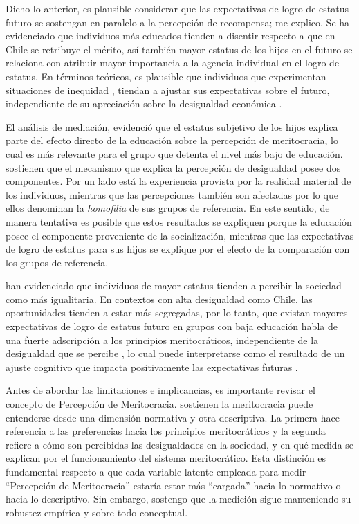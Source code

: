 \documentclass[12pt]{article}
\begin{document}
Dicho lo anterior, es plausible considerar que las expectativas de logro de estatus futuro se sostengan en paralelo a la percepción de recompensa; me explico. Se ha evidenciado que individuos más educados tienden a disentir respecto a que en Chile se retribuye el mérito, así también mayor estatus de los hijos en el futuro se relaciona con atribuir mayor importancia a la agencia individual en el logro de estatus. En términos teóricos, es plausible que individuos que experimentan situaciones de inequidad \citep{Adams1965}, tiendan a ajustar sus expectativas sobre el futuro, independiente de su apreciación sobre la desigualdad económica \citep{Castillo2012,Trump2017}.

El análisis de mediación, evidenció que el estatus subjetivo de los hijos explica parte del efecto directo de la educación sobre la percepción de meritocracia, lo cual es más relevante  para el grupo que detenta el nivel más bajo de educación. \cite{Evans2004} sostienen que el mecanismo que explica la percepción de desigualdad posee dos componentes. Por un lado está la experiencia provista por la realidad material de los individuos, mientras que las percepciones también son afectadas por lo que ellos denominan la \emph{homofilia} de sus grupos de referencia. En este sentido, de manera tentativa es posible que estos resultados se expliquen porque la educación posee el componente proveniente de la socialización, mientras que las expectativas de logro de estatus para sus hijos se explique por el efecto de la comparación con los grupos de referencia.   

\cite{Evans2017} han evidenciado que individuos de mayor estatus tienden a percibir la sociedad como más igualitaria. En contextos con alta desigualdad como Chile, las oportunidades tienden a estar más segregadas, por lo tanto, que existan mayores expectativas de logro de estatus futuro en grupos con baja educación habla de una fuerte adscripción a los principios meritocráticos, independiente de la desigualdad que se percibe \citep{Castillo2012}, lo cual puede interpretarse como el resultado de un ajuste cognitivo que impacta positivamente las expectativas futuras \citep{Trump2017}.

Antes de abordar las limitaciones e implicancias, es importante revisar el concepto de Percepción de Meritocracia. \cite{Castillo2018} sostienen la meritocracia puede entenderse desde una dimensión normativa y otra descriptiva. La primera hace referencia a las preferencias hacia los principios meritocráticos y la segunda refiere a cómo son percibidas las desigualdades en la sociedad, y en qué medida se explican por el funcionamiento del sistema meritocrático. Esta distinción es fundamental respecto a que cada variable latente empleada para medir ``Percepción de Meritocracia'' estaría estar más ``cargada'' hacia lo normativo o hacia lo descriptivo. Sin embargo, sostengo que la medición sigue manteniendo su robustez empírica y sobre todo conceptual.   
\end{document}
